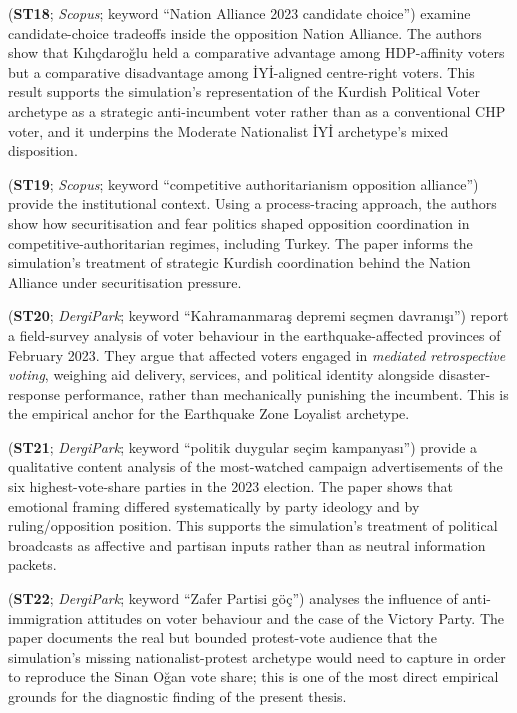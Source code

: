 \documentclass[12pt,a4paper]{report}
\begin{document}
\citet{baruh2024difficult} (\textbf{ST18}; \emph{Scopus}; keyword \enquote{Nation Alliance 2023 candidate choice}) examine candidate-choice tradeoffs inside the opposition Nation Alliance. The authors show that K\i l\i\c{c}daro\u{g}lu held a comparative advantage among HDP-affinity voters but a comparative disadvantage among \.IY\.I-aligned centre-right voters. This result supports the simulation's representation of the Kurdish Political Voter archetype as a strategic anti-incumbent voter rather than as a conventional CHP voter, and it underpins the Moderate Nationalist \.IY\.I archetype's mixed disposition.

\citet{ilbiz2023securitization} (\textbf{ST19}; \emph{Scopus}; keyword \enquote{competitive authoritarianism opposition alliance}) provide the institutional context. Using a process-tracing approach, the authors show how securitisation and fear politics shaped opposition coordination in competitive-authoritarian regimes, including Turkey. The paper informs the simulation's treatment of strategic Kurdish coordination behind the Nation Alliance under securitisation pressure.

\citet{sevinc2024afet} (\textbf{ST20}; \emph{DergiPark}; keyword \enquote{Kahramanmara\c{s} depremi se\c{c}men davran\i\c{s}\i}) report a field-survey analysis of voter behaviour in the earthquake-affected provinces of February 2023. They argue that affected voters engaged in \emph{mediated retrospective voting}, weighing aid delivery, services, and political identity alongside disaster-response performance, rather than mechanically punishing the incumbent. This is the empirical anchor for the Earthquake Zone Loyalist archetype.

\citet{zeynel2024duygular} (\textbf{ST21}; \emph{DergiPark}; keyword \enquote{politik duygular se\c{c}im kampanyas\i}) provide a qualitative content analysis of the most-watched campaign advertisements of the six highest-vote-share parties in the 2023 election. The paper shows that emotional framing differed systematically by party ideology and by ruling/opposition position. This supports the simulation's treatment of political broadcasts as affective and partisan inputs rather than as neutral information packets.

\citet{gerim2025victory} (\textbf{ST22}; \emph{DergiPark}; keyword \enquote{Zafer Partisi g\"o\c{c}}) analyses the influence of anti-immigration attitudes on voter behaviour and the case of the Victory Party. The paper documents the real but bounded protest-vote audience that the simulation's missing nationalist-protest archetype would need to capture in order to reproduce the Sinan O\u{g}an vote share; this is one of the most direct empirical grounds for the diagnostic finding of the present thesis.
\end{document}
